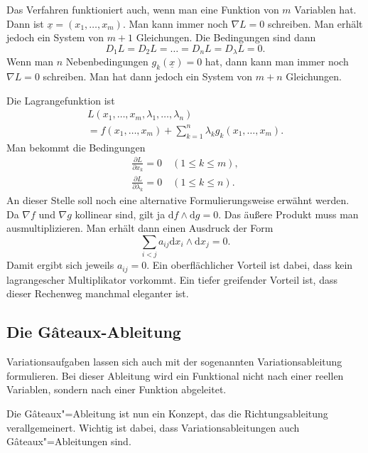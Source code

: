 \documentclass[a4paper,10pt,fleqn,twocolumn,twoside]{article}
\numberwithin{equation}{section}
\begin{document}
Das Verfahren funktioniert auch, wenn man eine Funktion von $m$
Variablen hat. Dann ist $\underline x=(x_1,\ldots,x_m).$
Man kann immer noch $\nabla L=0$ schreiben. Man erhält jedoch ein
System von $m+1$ Gleichungen. Die Bedingungen sind dann
\begin{equation}
D_1 L = D_2 L = \ldots = D_n L = D_\lambda L = 0.
\end{equation}
%
Wenn man $n$ Nebenbedingungen $g_k(\underline x)=0$ hat,
dann kann man immer noch $\nabla L=0$ schreiben.
Man hat dann jedoch ein System von $m+n$ Gleichungen.

Die Lagrangefunktion ist
\begin{gather*}
L(x_1,\ldots,x_m,\lambda_1,\ldots,\lambda_n)\\
= f(x_1,\ldots,x_m)+\sum_{k=1}^n \lambda_k g_k(x_1,\ldots,x_m).
\end{gather*}
Man bekommt die Bedingungen
\begin{gather*}
\frac{\partial L}{\partial x_k}=0 \quad (1\le k\le m),\\
\frac{\partial L}{\partial \lambda_k}=0 \quad (1\le k\le n).
\end{gather*}
An dieser Stelle soll noch eine alternative Formulierungsweise
erwähnt werden. Da $\nabla f$ und $\nabla g$ kollinear sind,
gilt ja $\mathrm df\wedge\mathrm dg=0$. Das äußere Produkt muss
man ausmultiplizieren. Man erhält dann einen Ausdruck der Form
\begin{equation}
\sum_{i<j} a_{ij}\mathrm dx_i\wedge\mathrm dx_j=0.
\end{equation}
Damit ergibt sich jeweils $a_{ij}=0$. Ein oberflächlicher Vorteil
ist dabei, dass kein lagrangescher Multiplikator vorkommt.
Ein tiefer greifender Vorteil ist, dass dieser Rechenweg manchmal
eleganter ist.

\subsection{Die Gâteaux-Ableitung}

Variationsaufgaben lassen sich auch mit der sogenannten
Variationsableitung formulieren. Bei dieser Ableitung wird ein
Funktional nicht nach einer reellen Variablen, sondern nach einer
Funktion abgeleitet.

Die Gâteaux"=Ableitung ist nun ein Konzept, das die Richtungsableitung
verallgemeinert. Wichtig ist dabei, dass Variationsableitungen auch
Gâteaux"=Ableitungen sind.
\end{document}
